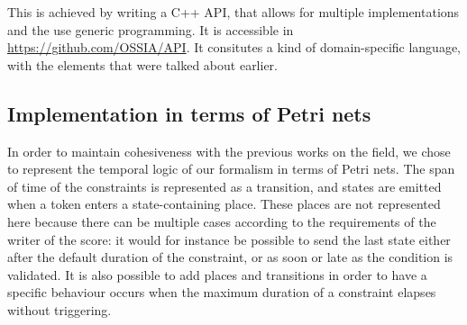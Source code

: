 \documentclass{article}
\begin{document}
	This is achieved by writing a C++ API, that allows for multiple implementations and the use generic programming. It is accessible in \url{https://github.com/OSSIA/API}. It consitutes a kind of domain-specific language, with the elements that were talked about earlier.
%	
%	
	
	
	\subsection{Implementation in terms of Petri nets}
	In order to maintain cohesiveness with the previous works on the field, we chose to represent the temporal logic of our formalism in terms of Petri nets. The span of time of the constraints is represented as a transition, and states are emitted when a token enters a state-containing place. These places are not represented here because there can be multiple cases according to the requirements of the writer of the score: it would for instance be possible to send the last state either after the default duration of the constraint, or as soon or late as the condition is validated.
	It is also possible to add places and transitions in order to have a specific behaviour occurs when the maximum duration of a constraint elapses without triggering.
	
\end{document}
